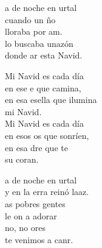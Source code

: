 \begin{cancion}[Mi Navidad][]%
	a de noche en urtal\\
	cuando un ño\\
	lloraba por am.\\
	lo buscaba unazón\\
	donde ar esta Navid.\jump\\
	\begin{chorus}%
		Mi Navid es cada día\\
		en ese e que camina,\\
		en esa esella que ilumina\\
		mi Navid.\\
		Mi Navid es cada día\\
		en esos os que sonríen,\\
		en esa dre que te  \\
		su coran.\jump\\
	\end{chorus}%
	a de noche en urtal\\
	y en la erra reinó laaz.\\
	as pobres gentes\\
	le on a adorar\\
	no, no ores\\
	te venimos a canr.\\
\end{cancion}%
